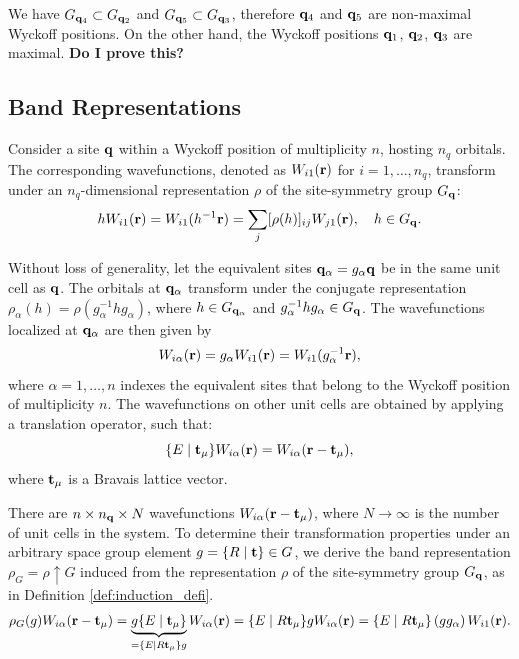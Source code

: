 \begin{example} \label{ex:maximal_wyckpos_example}
We have $G_{{\vb{q}}_4} \subset G_{{\vb{q}}_2}$ and $G_{{\vb{q}}_5} \subset G_{{\vb{q}}_3}$, therefore ${\vb{q}}_4$ and ${\vb{q}}_5$ are non-maximal Wyckoff positions. On the other hand, the Wyckoff positions ${\vb{q}}_1$, ${\vb{q}}_2$, ${\vb{q}}_3$ are maximal. \textbf{Do I prove this?}
\end{example}

\subsection{Band Representations}

Consider a site \({\vb{q}}\) within a Wyckoff position of multiplicity \(n\), hosting \(n_q\) orbitals. The corresponding wavefunctions, denoted as \(W_{i1}({\vb{r}})\) for \(i = 1, \ldots, n_q\), transform under an \(n_q\)-dimensional representation \(\rho\) of the site-symmetry group \(G_{\vb{q}}\):
\begin{equation} \label{eq:gWi1_nq_rep}
h W_{i1}({\vb{r}}) = W_{i1}(h^{-1} {\vb{r}}) = \sum_{j} [\rho(h)]_{ij} W_{j1}({\vb{r}}), \quad h \in G_{\vb{q}}.
\end{equation}

Without loss of generality, let the equivalent sites \({\vb{q}}_\alpha = g_{\alpha} {\vb{q}}\) be in the same unit cell as \({\vb{q}}\). The orbitals at \({\vb{q}}_\alpha\) transform under the conjugate representation \(\rho_\alpha(h) = \rho(g_\alpha^{-1} h g_\alpha)\), where \(h \in G_{{\vb{q}}_\alpha}\) and \(g_\alpha^{-1} h g_\alpha \in G_{\vb{q}}\). The wavefunctions localized at \({\vb{q}}_\alpha\) are then given by
\begin{equation} \label{eq:Wialpha_galpha_action}
W_{i\alpha}({\vb{r}}) = g_\alpha W_{i1}({\vb{r}}) = W_{i1}(g_\alpha^{-1} {\vb{r}}),
\end{equation}
where \(\alpha = 1, \ldots, n\) indexes the equivalent sites that belong to the Wyckoff position of multiplicity \(n\). The wavefunctions on other unit cells are obtained by applying a translation operator, such that:
\begin{equation} \label{eq:translated_Wialpha}
\{ E \mid {\vb{t}}_\mu \} W_{i\alpha}({\vb{r}}) = W_{i\alpha}({\vb{r}}-{\vb{t}}_\mu),
\end{equation}
where ${\vb{t}}_\mu$ is a Bravais lattice vector.

There are \(n \times n_{\vb{q}} \times N\) wavefunctions \(W_{i\alpha}({\vb{r}} - {\vb{t}}_\mu)\), where \(N \to \infty\) is the number of unit cells in the system. To determine their transformation properties under an arbitrary space group element \(g = \{ R \mid {\vb{t}} \} \in G\), we derive the band representation \(\rho_G = \rho \uparrow G\) induced from the representation \(\rho\) of the site-symmetry group \(G_{\vb{q}}\), as in Definition \ref{def:induction_defi}.
\begin{equation} \label{eq:induced_rho_G_wannier_step1}
\rho_G(g) W_{i\alpha}({\vb{r}}-{\vb{t}}_\mu) =
\underbrace{g \{ E \mid {\vb{t}}_\mu \}}_{= \{ E \mid R{\vb{t}}_\mu \} g} W_{i\alpha} ({\vb{r}}) =
\{ E \mid R{\vb{t}}_\mu \} g W_{i\alpha} ({\vb{r}}) =
\{ E \mid R{\vb{t}}_\mu \} \, (g g_\alpha) \, W_{i1} ({\vb{r}}).
\end{equation}

